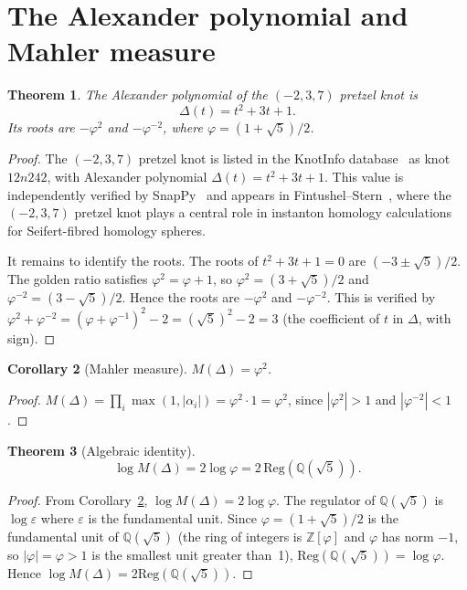 \documentclass[12pt]{article}
\newtheorem{theorem}{Theorem}[section]
\newtheorem{corollary}[theorem]{Corollary}
\theoremstyle{definition}
\theoremstyle{remark}
\newcommand{\Z}{\mathbb{Z}}
\newcommand{\Q}{\mathbb{Q}}
\newcommand{\vp}{\varphi}
\begin{document}
\section{The Alexander polynomial and Mahler measure}
\label{sec:alexander}

\begin{theorem}\label{thm:alexander}
The Alexander polynomial of the $(-2,3,7)$ pretzel knot is
\[
\Delta(t) = t^2 + 3t + 1.
\]
Its roots are $-\vp^2$ and $-\vp^{-2}$, where $\vp=(1+\sqrt5)/2$.
\end{theorem}

\begin{proof}
The $(-2,3,7)$ pretzel knot is listed in the KnotInfo database~\cite{KnotInfo}
as knot $12n242$, with Alexander polynomial $\Delta(t)=t^2+3t+1$.
This value is independently verified by SnapPy~\cite{SnapPy} and
appears in Fintushel--Stern~\cite{FintushelStern1990}, where the
$(-2,3,7)$ pretzel knot plays a central role in instanton homology
calculations for Seifert-fibred homology spheres.

It remains to identify the roots.  The roots of $t^2+3t+1=0$ are
$(-3\pm\sqrt5)/2$.  The golden ratio satisfies $\vp^2=\vp+1$, so
$\vp^2=(3+\sqrt5)/2$ and $\vp^{-2}=(3-\sqrt5)/2$.
Hence the roots are $-\vp^2$ and $-\vp^{-2}$.
This is verified by $\vp^2+\vp^{-2}=(\vp+\vp^{-1})^2-2=(\sqrt5)^2-2=3$
(the coefficient of $t$ in $\Delta$, with sign).
\end{proof}

\begin{corollary}[Mahler measure]\label{cor:mahler}
$M(\Delta)=\vp^2$.
\end{corollary}

\begin{proof}
$M(\Delta)=\prod_i\max(1,|\alpha_i|)=\vp^2\cdot1=\vp^2$,
since $|\vp^2|>1$ and $|\vp^{-2}|<1$.
\end{proof}

\begin{theorem}[Algebraic identity]\label{thm:bridge}
\[
\log M(\Delta) = 2\log\vp = 2\,\mathrm{Reg}(\Q(\sqrt5)).
\]
\end{theorem}

\begin{proof}
From Corollary~\ref{cor:mahler}, $\log M(\Delta)=2\log\vp$.
The regulator of $\Q(\sqrt5)$ is $\log\varepsilon$ where $\varepsilon$
is the fundamental unit.  Since $\vp=(1+\sqrt5)/2$ is the fundamental
unit of $\Q(\sqrt5)$ (the ring of integers is $\Z[\vp]$ and $\vp$ has
norm $-1$, so $|\vp|=\vp>1$ is the smallest unit greater than~1),
$\mathrm{Reg}(\Q(\sqrt5))=\log\vp$.  Hence
$\log M(\Delta)=2\mathrm{Reg}(\Q(\sqrt5))$.
\end{proof}
\end{document}
